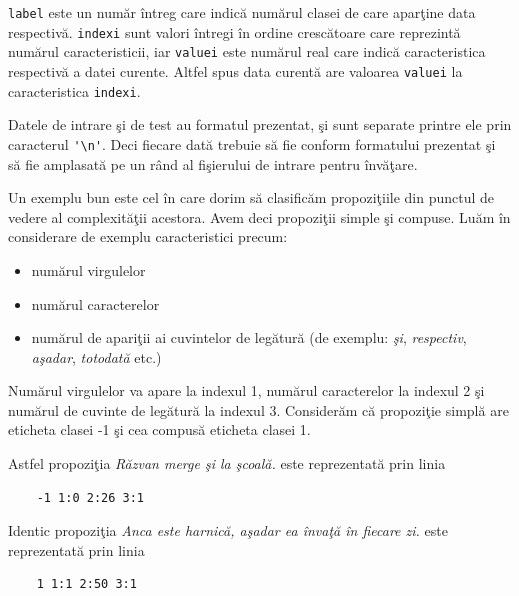 \documentclass[a4paper,12pt]{report}
\begin{document}
  \verb|label| este un num\u ar \^intreg care indic\u a num\u arul clasei de care apar\c tine data respectiv\u a.
  \verb|indexi| sunt valori \^intregi \^in ordine cresc\u atoare care reprezint\u a num\u arul caracteristicii, iar 
  \verb|valuei| este num\u arul real care indic\u a caracteristica respectiv\u a a datei curente. Altfel spus 
  data curent\u a are valoarea \verb|valuei| la caracteristica \verb|indexi|.
  
  \par
  Datele de intrare \c si de test au formatul prezentat, \c si sunt separate printre ele prin caracterul 
  \verb|'\n'|. Deci fiecare dat\u a trebuie s\u a fie conform formatului prezentat \c si s\u a fie
  amplasat\u a pe un r\^and al fi\c sierului de intrare pentru \^inv\u a\c tare.

  \par
  Un exemplu bun este cel \^in care dorim s\u a clasific\u am propozi\c tiile din punctul de vedere al 
  complexit\u a\c tii acestora. Avem deci propozi\c tii simple \c si compuse. Lu\u am \^in considerare de
  exemplu caracteristici precum:
   
  \begin{itemize}
     \item{} num\u arul virgulelor 
     \item num\u arul caracterelor
     \item num\u arul de apari\c tii ai cuvintelor de leg\u atur\u a (de exemplu: 
      \textit{\c si}, \textit{respectiv}, \textit{a\c sadar}, \textit{totodat\u a} etc.)
  \end{itemize}
  
  \par
  Num\u arul virgulelor va apare la indexul 1, num\u arul caracterelor la indexul 2 \c si num\u arul 
  de cuvinte de leg\u atur\u a la indexul 3. Consider\u am c\u a propozi\c tie simpl\u a are eticheta clasei 
  -1 \c si cea compus\u a eticheta clasei 1. 
  
  \par
  Astfel propozi\c tia \textit{R\u azvan merge \c si la \c scoal\u a.} este reprezentat\u a prin linia
  
  \begin{verbatim}
    -1 1:0 2:26 3:1
  \end{verbatim}

  Identic propozi\c tia \textit{Anca este harnic\u a, a\c sadar ea \^inva\c t\u a \^in fiecare zi.} este
  reprezentat\u a prin linia
  
  \begin{verbatim}
    1 1:1 2:50 3:1
  \end{verbatim}
  
\end{document}
